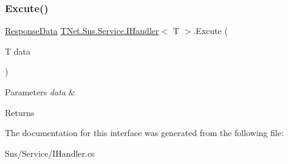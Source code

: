 \subsubsection{\texorpdfstring{Excute()}{Excute()}}
{\footnotesize\ttfamily \mbox{\hyperlink{class_t_net_1_1_sns_1_1_service_1_1_response_data}{Response\+Data}} \mbox{\hyperlink{interface_t_net_1_1_sns_1_1_service_1_1_i_handler}{T\+Net.\+Sns.\+Service.\+I\+Handler}}$<$ T $>$.Excute (\begin{DoxyParamCaption}\item[{T}]{data }\end{DoxyParamCaption})}






\begin{DoxyParams}{Parameters}
{\em data} & \\
\hline
\end{DoxyParams}
\begin{DoxyReturn}{Returns}

\end{DoxyReturn}


The documentation for this interface was generated from the following file\+:\begin{DoxyCompactItemize}
\item 
Sns/\+Service/I\+Handler.\+cs\end{DoxyCompactItemize}
